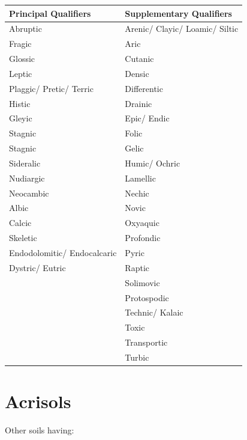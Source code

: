 \documentclass[
  letterpaper,
  DIV=11,
  numbers=noendperiod]{scrreprt}
\begin{document}
\begin{longtable}[]{@{}ll@{}}
\toprule()
Principal Qualifiers & Supplementary Qualifiers \\
\midrule()
\endhead
Abruptic & Arenic/ Clayic/ Loamic/ Siltic \\
Fragic & Aric \\
Glossic & Cutanic \\
Leptic & Densic \\
Plaggic/ Pretic/ Terric & Differentic \\
Histic & Drainic \\
Gleyic & Epic/ Endic \\
Stagnic & Folic \\
Stagnic & Gelic \\
Sideralic & Humic/ Ochric \\
Nudiargic & Lamellic \\
Neocambic & Nechic \\
Albic & Novic \\
Calcic & Oxyaquic \\
Skeletic & Profondic \\
Endodolomitic/ Endocalcaric & Pyric \\
Dystric/ Eutric & Raptic \\
& Solimovic \\
& Protospodic \\
& Technic/ Kalaic \\
& Toxic \\
& Transportic \\
& Turbic \\
\bottomrule()
\end{longtable}


\hypertarget{key-acrisols}{%
\chapter{Acrisols}\label{key-acrisols}}

Other soils having:
\end{document}
